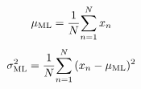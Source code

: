 $$\mu_{{\rm ML}}=\frac{1}{N}{\sum_{n=1}^{N}{x_n}}$$
$$\sigma_{{\rm ML}}^{2}=\frac{1}{N}{\sum_{n=1}^{N}{(x_n - \mu _{\rm ML})^2}}$$
